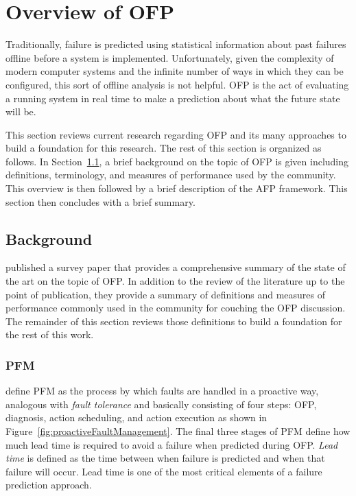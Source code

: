 \section{Overview of \ac{OFP}} \label{chapter2}
Traditionally, failure is predicted using statistical information about past
failures offline before a system is implemented.  Unfortunately, given the
complexity of modern computer systems and the infinite number of ways in which
they can be configured, this sort of offline analysis is not helpful.  \ac{OFP}
is the act of evaluating a running system in real time to make a prediction
about what the future state will be.

This section reviews current research regarding \ac{OFP} and its many
approaches to build a foundation for this research.  The rest of
this section is organized as follows.  In Section~\ref{background}, a brief
background on the topic of \ac{OFP} is given including definitions,
terminology, and measures of performance used by the community.  This
overview is then followed by a brief description of the \ac{AFP} framework.
This section then concludes with a brief summary.

\subsection{Background} \label{background}
\citet{salfnerSurvey} published a survey paper that provides a comprehensive
summary of the state of the art on the topic of \ac{OFP}.  In addition to the
review of the literature up to the point of publication, they provide a summary
of definitions and measures of performance commonly used in the community for
couching the \ac{OFP} discussion.  The remainder of this section reviews those
definitions to build a foundation for the rest of this work.

\subsubsection{\ac{PFM}} \label{pfm}
\citet{salfnerSurvey} define \ac{PFM} as the process by which faults are
handled in a proactive way, analogous with \emph{fault tolerance} and basically
consisting of four steps: \ac{OFP}, diagnosis, action scheduling, and action
execution as shown in Figure~\ref{fig:proactiveFaultManagement}.  The final
three stages of \ac{PFM} define how much lead time is required to avoid a
failure when predicted during \ac{OFP}.  \emph{Lead time} is defined as the
time between when failure is predicted and when that failure will occur.  Lead
time is one of the most critical elements of a failure prediction approach.

